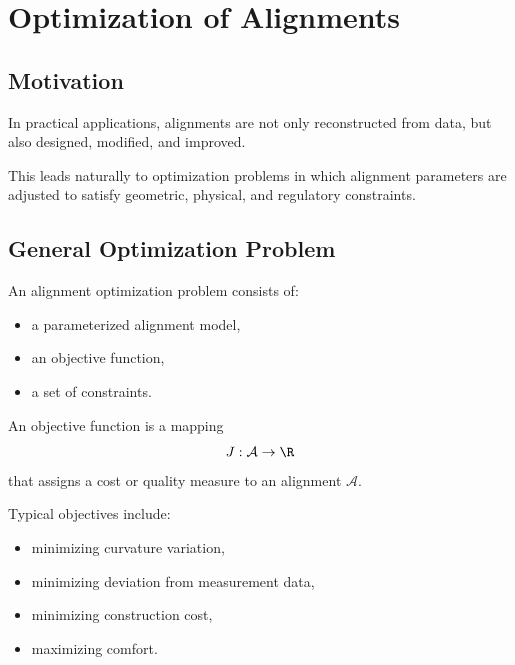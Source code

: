 \chapter{Optimization of Alignments}

\section{Motivation}

\begin{remark}
In practical applications, alignments are not only reconstructed from
data, but also designed, modified, and improved.
\end{remark}

\begin{remark}
This leads naturally to optimization problems in which alignment
parameters are adjusted to satisfy geometric, physical, and regulatory
constraints.
\end{remark}

\section{General Optimization Problem}

\begin{definition}
An alignment optimization problem consists of:
\begin{itemize}
\item a parameterized alignment model,
\item an objective function,
\item a set of constraints.
\end{itemize}
\end{definition}

\begin{definition}
An objective function is a mapping
\[
J : \mathcal{A} \to \R
\]
that assigns a cost or quality measure to an alignment $\mathcal{A}$.
\end{definition}

\begin{remark}
Typical objectives include:
\begin{itemize}
\item minimizing curvature variation,
\item minimizing deviation from measurement data,
\item minimizing construction cost,
\item maximizing comfort.
\end{itemize}
\end{remark}


